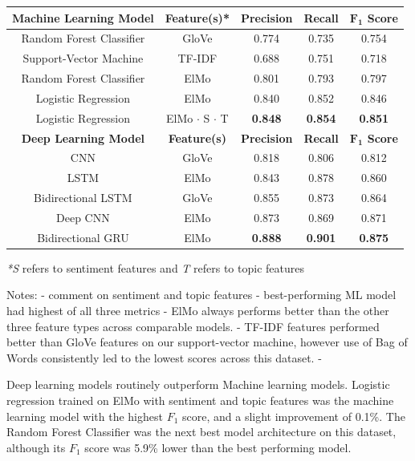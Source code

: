 \documentclass[12pt,a4paper]{article}
\begin{document}
\begin{center}
	\begin{tabular}{ |c||c|c|c|c|}
		\hline
		\textbf{Machine Learning Model}& \textbf{Feature(s)*} & \textbf{Precision} & \textbf{Recall} & \textbf{$\mathbf{F_1}$ Score}\\
		\hline\hline
		Random Forest Classifier & GloVe  & 0.774   & 0.735 & 0.754\\
		Support-Vector Machine & TF-IDF  & 0.688   & 0.751 & 0.718\\
		Random Forest Classifier & ElMo  & 0.801   & 0.793 & 0.797\\
		Logistic Regression & ElMo  & 0.840   & 0.852 & 0.846\\
		Logistic Regression & ElMo $\cdot$ S $\cdot$ T & \textbf{0.848}   & \textbf{0.854} & \textbf{0.851}\\
		\hline\hline
		\textbf{Deep Learning Model}& \textbf{Feature(s)} & \textbf{Precision} & \textbf{Recall} & \textbf{$\mathbf{F_1}$ Score}\\
		\hline
		CNN & GloVe  & 0.818 & 0.806 & 0.812\\
		LSTM & ElMo  & 0.843   & 0.878 & 0.860\\
		Bidirectional LSTM & GloVe  & 0.855   & 0.873 & 0.864\\
		Deep CNN & ElMo & 0.873   & 0.869 & 0.871\\
		Bidirectional GRU & ElMo  & \textbf{0.888}   & \textbf{0.901} & \textbf{0.875}\\
		\hline
	\end{tabular}
\end{center}
\textit{*S} refers to sentiment features and \textit{T} refers to topic features\\\vspace{-10pt}


Notes:
- comment on sentiment and topic features
- best-performing ML model had highest of all three metrics
- ElMo always performs better than the other three feature types across comparable models.
- TF-IDF features performed better than GloVe features on our support-vector machine, however use of Bag of Words consistently led to the lowest scores across this dataset.
- 


\noindent Deep learning models routinely outperform Machine learning models.
Logistic regression trained on ElMo with sentiment and topic features was the machine learning model with the highest $F_1$ score, and a slight improvement of 0.1\%. The Random Forest Classifier was the next best model architecture on this dataset, although its $F_1$ score was 5.9\% lower than the best performing model. 
\end{document}
